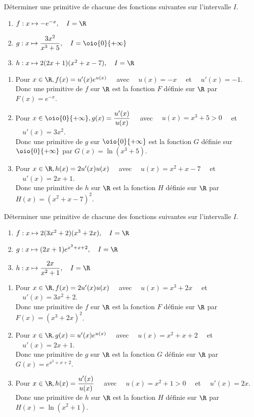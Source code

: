 \documentclass[a4paper,11pt,exos]{nsi} %
\begin{document}
\exo{}
Déterminer une primitive de chacune des fonctions suivantes sur l'intervalle $I$.
\begin{enumerate}
    \item $f:x\mapsto -e^{-x}, \quad I=\R$
    \item $g:x\mapsto \dfrac{3x^2}{x^3+5}, \quad I=\oio{0}{+\infty}$
    \item $h:x\mapsto 2(2x+1)(x^2+x-7), \quad I=\R$
\end{enumerate}

\textcolor{UGLiBlue}{
    \begin{enumerate}
        \item Pour $x\in\R, f(x)=u'(x)e^{u(x)}\quad$ avec $\quad u(x)=-x\quad$ et $\quad u'(x)=-1$.\\
        Donc une primitive de $f$ sur $\R$ est la fonction $F$ définie sur $\R$ par $F(x)=e^{-x}$.
        \item Pour $x\in\oio{0}{+\infty}, g(x)=\dfrac{u'(x)}{u(x)}\quad$ avec $\quad u(x)=x^3+5>0\quad$ et $\quad u'(x)=3x^2$.\\
        Donc une primitive de $g$ sur $\oio{0}{+\infty}$ est la fonction $G$ définie sur $\oio{0}{+\infty}$ par $G(x)=\ln(x^3+5)$.
        \item Pour $x\in\R, h(x)=2u'(x)u(x)\quad$ avec $\quad u(x)=x^2+x-7\quad$ et $\quad u'(x)=2x+1$.\\
        Donc une primitive de $h$ sur $\R$ est la fonction $H$ définie sur $\R$ par $H(x)=(x^2+x-7)^2$.
    \end{enumerate}
}
       
\exo{}
Déterminer une primitive de chacune des fonctions suivantes sur l'intervalle $I$.
    \begin{enumerate}
        \item $f:x\mapsto 2(3x^2+2)(x^3+2x), \quad I=\R$
        \item $g:x\mapsto (2x+1)e^{x^2+x+2}, \quad I=\R$
        \item $h:x\mapsto \dfrac{2x}{x^2+1}, \quad I=\R$
    \end{enumerate}

\textcolor{UGLiBlue}{
    \begin{enumerate}
        \item Pour $x\in\R, f(x)=2u'(x)u(x)\quad$ avec $\quad u(x)=x^3+2x\quad$ et $\quad u'(x)=3x^2+2$.\\
        Donc une primitive de $f$ sur $\R$ est la fonction $F$ définie sur $\R$ par $F(x)=\left(x^3+2x\right)^2$.
        \item Pour $x\in\R, g(x)=u'(x)e^{u(x)}\quad$ avec $\quad u(x)=x^2+x+2\quad$ et $\quad u'(x)=2x+1$.\\
        Donc une primitive de $g$ sur $\R$ est la fonction $G$ définie sur $\R$ par $G(x)=e^{x^2+x+2}$.
        \item Pour $x\in\R, h(x)=\dfrac{u'(x)}{u(x)}\quad$ avec $\quad u(x)=x^2+1>0\quad$ et $\quad u'(x)=2x$.\\
        Donc une primitive de $h$ sur $\R$ est la fonction $H$ définie sur $\R$ par $H(x)=\ln(x^2+1)$.
    \end{enumerate}
}
\end{document}
